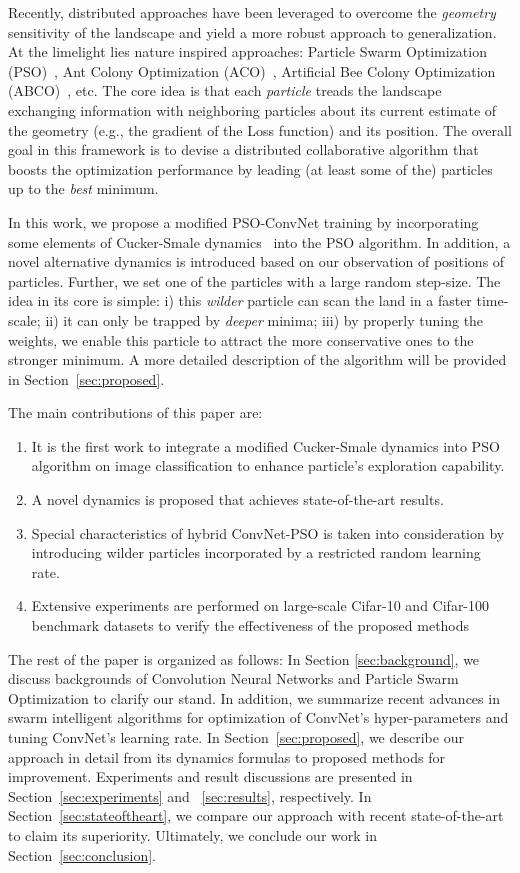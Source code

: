 \documentclass{ieeeaccess}
\begin{document}
Recently, distributed approaches have been leveraged to overcome the \emph{geometry} sensitivity of the landscape and yield a more robust approach to generalization. At the limelight lies nature inspired approaches: Particle Swarm Optimization (PSO)~\cite{houssein2021major,kennedy1995particle,shi1998modified}, Ant Colony Optimization (ACO)~\cite{rokbani2021bi,dorigo2006ant}, Artificial Bee Colony Optimization (ABCO)~\cite{jacob2021artificial,karaboga2005idea}, etc. The core idea is that each \emph{particle} treads the landscape exchanging information with neighboring particles about its current estimate of the geometry (e.g., the gradient of the Loss function) and its position. The overall goal in this framework is to devise a distributed collaborative algorithm that boosts the optimization performance by leading (at least some of the) particles up to the \emph{best} minimum.

In this work, we propose a modified PSO-ConvNet training by incorporating some elements of Cucker-Smale dynamics~\cite{cucker2007emergent} into the PSO algorithm. In addition, a novel alternative dynamics is introduced based on our observation of positions of particles. Further, we set one of the particles with a large random step-size. The idea in its core is simple: i) this \emph{wilder} particle can scan the land in a faster time-scale; ii) it can only be trapped by \emph{deeper} minima; iii) by properly tuning the weights, we enable this particle to attract the more conservative ones to the stronger minimum. A more detailed description of the algorithm will be provided in Section~\ref{sec:proposed}.

The main contributions of this paper are:
\begin{enumerate}   
\item It is the first work to integrate a modified Cucker-Smale dynamics into PSO algorithm on image classification to enhance particle's exploration capability.  
\item A novel dynamics is proposed that achieves state-of-the-art results.
\item Special characteristics of hybrid ConvNet-PSO is taken into consideration by introducing wilder particles incorporated by a restricted random learning rate.
\item Extensive experiments are performed on large-scale Cifar-10 and Cifar-100 benchmark datasets to verify the effectiveness of the proposed methods
\end{enumerate}  

The rest of the paper is organized as follows: In Section \ref{sec:background}, we discuss backgrounds of Convolution Neural Networks and Particle Swarm Optimization to clarify our stand. In addition, we summarize recent advances in swarm intelligent algorithms for optimization of ConvNet's hyper-parameters and tuning ConvNet's learning rate. In Section~\ref{sec:proposed}, we describe our approach in detail from its dynamics formulas to proposed methods for improvement. Experiments and result discussions are presented in Section~\ref{sec:experiments} and ~\ref{sec:results}, respectively. In Section~\ref{sec:stateoftheart}, we compare our approach with recent state-of-the-art to claim its superiority. Ultimately, we conclude our work in Section~\ref{sec:conclusion}.
\end{document}
